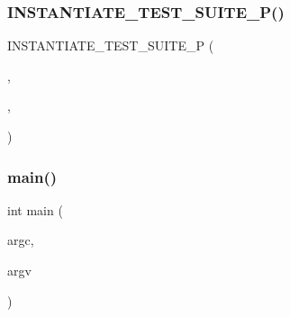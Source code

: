 \mbox{\label{_obj__test_2lib_2googletest-master_2googletest_2test_2googletest-param-test-test_8cc_a6941458969980054942f74dd41cd731a}} 
\subsubsection{\texorpdfstring{INSTANTIATE\_TEST\_SUITE\_P()}{INSTANTIATE\_TEST\_SUITE\_P()}\hspace{0.1cm}{\footnotesize\ttfamily [20/20]}}
{\footnotesize\ttfamily I\+N\+S\+T\+A\+N\+T\+I\+A\+T\+E\+\_\+\+T\+E\+S\+T\+\_\+\+S\+U\+I\+T\+E\+\_\+P (\begin{DoxyParamCaption}\item[{My\+Enum\+Tests}]{,  }\item[{\mbox{\hyperlink{class_my_enum_test}{My\+Enum\+Test}}}]{,  }\item[{\+::\mbox{\hyperlink{namespacetesting_abd3c87b40c2a0663691c9b617ed5fcc2}{testing\+::\+Values}}(\mbox{\hyperlink{_obj__test_2lib_2googletest-master_2googletest_2test_2googletest-param-test-test_8cc_a057c666e39cf0735f5e7e74747124787ab4f50b5eb533127652f9dbca6bdf6c3d}{E\+N\+U\+M1}}, \mbox{\hyperlink{_obj__test_2lib_2googletest-master_2googletest_2test_2googletest-param-test-test_8cc_a057c666e39cf0735f5e7e74747124787ac3a9f8169cecee80b1d6d262cc1b83bd}{E\+N\+U\+M2}}, 0)}]{ }\end{DoxyParamCaption})}

\mbox{\label{_obj__test_2lib_2googletest-master_2googletest_2test_2googletest-param-test-test_8cc_a3c04138a5bfe5d72780bb7e82a18e627}} 
\subsubsection{\texorpdfstring{main()}{main()}}
{\footnotesize\ttfamily int main (\begin{DoxyParamCaption}\item[{int}]{argc,  }\item[{char $\ast$$\ast$}]{argv }\end{DoxyParamCaption})}

